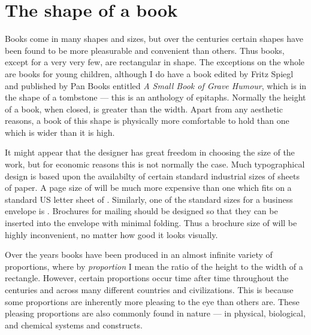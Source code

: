 \documentclass[10pt,a4paper,oneside,extrafontsizes]{memoir}%
\begin{document}
\section{The shape of a book}

\begin{paracol}{2}
\switchEng
    Books come in many shapes and sizes, but over the centuries certain
shapes have been found to be more pleasurable and convenient than others.
Thus books, except for a very very few, are rectangular in shape. The 
exceptions on the whole are books for young children, although I do
have a book edited by Fritz Spiegl and published by Pan Books entitled
\textit{A Small Book of Grave Humour}, which is in the shape of a tombstone
--- this is an anthology of epitaphs. Normally the height of a book, when 
closed, is greater than the width. Apart from any aesthetic reasons, 
a book of this shape is physically more comfortable to hold than one which 
is wider than it is high.

    It might appear that the designer has great freedom in choosing the
size of the work, but for economic reasons this is not normally the case.
Much typographical design is based upon the availabilty of certain 
standard industrial sizes of sheets of paper. 
A page size of  will be much more expensive than one 
which fits on a standard
US letter sheet 
of . 
Similarly, one of the standard sizes
for a business envelope is . 
Brochures for mailing
should be designed so that they can be inserted into the envelope with 
minimal folding. Thus a brochure size of  will be 
highly inconvenient, no matter how good it looks visually.

    Over the years books have been produced in an almost infinite variety
of proportions,
where by \emph{proportion}
I mean the ratio of the height to the width of a
rectangle. However, certain proportions occur time after time throughout
the centuries and across many different countries and 
civilizations. This is because some proportions are inherently
more pleasing to the eye than others are. These pleasing proportions are
also commonly found in nature --- in  physical, biological, and chemical
systems and constructs. 
\end{paracol}

\end{document}

